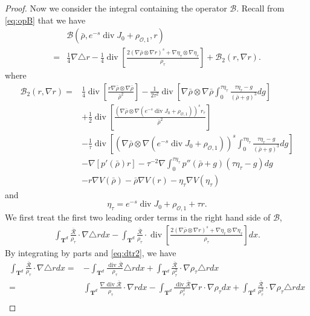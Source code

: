 \documentclass[english]{amsart}
\theoremstyle{plain}
\theoremstyle{definition}
\theoremstyle{remark}
\theoremstyle{plain}
\theoremstyle{plain}
\theoremstyle{plain}
\def\T{{\mathbf T}}%
\DeclareMathOperator{\diver}{div}
\numberwithin{equation}{section}
\begin{document}
\begin{proof}
Now we consider the integral containing the operator $\mathcal{B}$. Recall from \eqref{eq:opB} that we have
\begin{align*}
&\mathcal{B}(\bar\rho,e^{-s}\diver J_0+\rho_{\mathcal{O},1},r)\\
=&\frac14\nabla\triangle r-\frac14\diver\left[\frac{2(\nabla\bar\rho \otimes\nabla r)^s+\nabla \eta_\tau\otimes \nabla \eta_\tau}{\rho_\tau}\right]+\mathcal{B}_2(r,\nabla r).
\end{align*}
where
\begin{equation}\label{eq:B2}
\begin{aligned}
\mathcal{B}_2(r,\nabla r)=&\frac14\diver\left[\frac{r\nabla \bar\rho\otimes\nabla \bar\rho }{\bar\rho^2}\right]-\frac{1}{2\tau^2}\diver\left[\nabla \bar\rho\otimes\nabla \bar\rho\int_0^{\tau \eta_\tau}\frac{\tau \eta_\tau-g}{(\bar\rho+g)^3}dg\right]\\
&+\frac12\diver\left[\frac{(\nabla \bar\rho\otimes\nabla(e^{-s}\diver J_0+\rho_{\mathcal{O},1}))^sr_\tau}{\bar\rho^2}\right]\\
&-\frac{1}{\tau}\diver\left[(\nabla \bar\rho\otimes\nabla(e^{-s}\diver J_0+\rho_{\mathcal{O},1}))^s\int_0^{\tau \eta_\tau}\frac{\tau \eta_\tau-g}{(\bar\rho+g)^3}dg\right]\\
&-\nabla [p'(\bar\rho)r]-\tau^{-2}\nabla\int_0^{\tau \eta_\tau} p''(\bar\rho+g)(\tau \eta_\tau-g)dg\\
&-r\nabla V(\bar\rho)-\bar\rho\nabla V(r)-\eta_\tau\nabla V(\eta_\tau)
\end{aligned}
\end{equation}
and
\[
\eta_\tau=e^{-s}\diver J_0+\rho_{\mathcal{O},1}+\tau r.
\]
We first treat the first two leading order terms in the right hand side of $\mathcal{B}$,
\begin{align*}
\int_{\T^d} \frac{\overline{\mathcal{R}}}{\rho_\tau}\cdot\nabla\triangle rdx-\int_{\T^d} \frac{\overline{\mathcal{R}}}{\rho_\tau}\cdot\diver\left[\frac{2(\nabla\bar\rho \otimes\nabla r)^s+\nabla \eta_\tau\otimes \nabla \eta_\tau}{\rho_\tau}\right]dx.
\end{align*}
By integrating by parts and \eqref{eq:dtr2}, we have
\begin{align*}
\int_{\T^d} \frac{\overline{\mathcal{R}}}{\rho_\tau}\cdot\nabla\triangle rdx=&-\int_{\T^d} \frac{\diver \overline{\mathcal{R}}}{\rho_\tau}\triangle rdx+\int_{\T^d} \frac{\overline{\mathcal{R}}}{\rho_\tau^2}\cdot\nabla\rho_\tau\triangle r dx\\
=&\int_{\T^d} \frac{\nabla\diver \overline{\mathcal{R}}}{\rho_\tau}\cdot\nabla rdx-\int_{\T^d} \frac{\diver \overline{\mathcal{R}}}{\rho_\tau^2}\nabla r\cdot\nabla\rho_\tau dx+\int_{\T^d} \frac{\overline{\mathcal{R}}}{\rho_\tau^2}\cdot\nabla\rho_\tau\triangle r  dx\\

\end{align*}
\end{proof}
\end{document}
